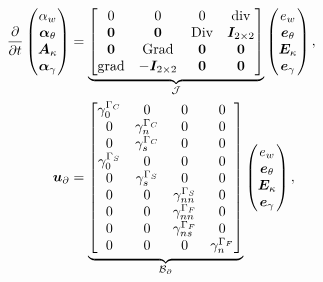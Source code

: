 \begin{equation*}
\begin{aligned}
\displaystyle
\diffp{}{t}
\begin{pmatrix}
\alpha_w \\
\bm\alpha_\theta \\
\bm{A}_\kappa \\
\bm\alpha_{\gamma} \\
\end{pmatrix} &= 
\underbrace{\begin{bmatrix}
	0  & 0  & 0  & \div \\
	\bm{0} & \bm{0} &  \Div & \bm{I}_{2 \times 2}\\
	\bm{0}  & \Grad  & \bm{0}  & \bm{0}\\
	\grad & -\bm{I}_{2 \times 2} &  \bm{0} & \bm{0} \\
	\end{bmatrix}}_{\mathcal{J}}
\begin{pmatrix}
e_w \\
\bm{e}_{\theta} \\
\bm{E}_{\kappa} \\
\bm{e}_{\gamma} \\
\end{pmatrix}, \vspace{3pt}\\
\bm{u}_\partial &= \underbrace{
	\begin{bmatrix}
	\gamma_{0}^{\Gamma_C} & {0} & {0} & {0} \\
	{0} & \gamma_n^{\Gamma_C} &  {0} & {0} \\
	{0} & \gamma_s^{\Gamma_C} &  {0} & {0} \\
	\gamma_{0}^{\Gamma_S} & {0} & {0} & {0} \\
	{0} & \gamma_s^{\Gamma_S} & {0} & {0} \\
	{0} &  {0} & \gamma_{nn}^{\Gamma_S} & {0} \\
	{0} &  {0} & \gamma_{nn}^{\Gamma_F} & {0} \\
	{0} &  {0} & \gamma_{ns}^{\Gamma_F} & {0} \\
	{0} &  {0} & {0} & \gamma_{n}^{\Gamma_F} \\
	\end{bmatrix}}_{\mathcal{B}_\partial} \begin{pmatrix}
e_w \\
\bm{e}_{\theta} \\
\bm{E}_{\kappa} \\
\bm{e}_{\gamma} \\
\end{pmatrix}, \vspace{3pt}\qquad

\end{aligned}
\end{equation*}
